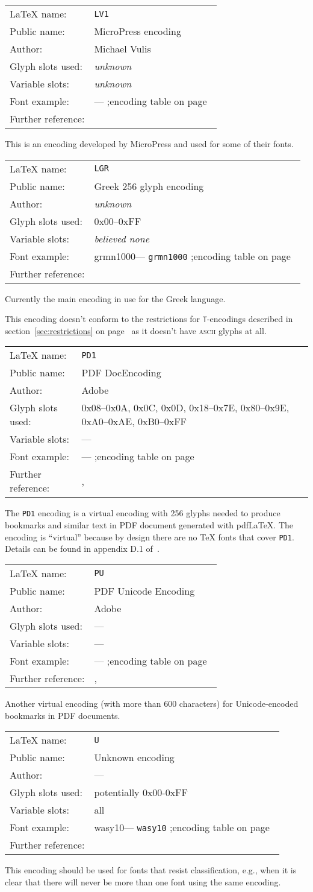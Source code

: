 \documentclass{ltxguide}[1994/11/20]
\makeatletter
\providecommand{\Enc}[1]{\texttt{#1}}
\newenvironment{encodinginfo}[7]%
  {\noindent
   \begin{tabularx}{\linewidth}{@{}l>{\raggedright\let\\\tabularnewline}X}%
     \LaTeX{} name:          & \texttt{#1}\\%
     Public name:          & #2\\%
     Author:                   & #3\\%
     Glyph slots used: & #4\\%
     Variable slots:     & #5\\%
     Font example:     & \def\@tempa{#6}\ifx\@tempa\@empty---%
                            \else\texttt{#6}\referenceftable{#6}\fi\\%
     Further reference:                & #7%
   \end{tabularx}%
   \par\nobreak
   \vspace*{3pt}%
   \quote
  }%
  {\endquote
   \vspace{6pt}}
\def\referenceftable#1{
  \@ifundefined{r@fonttable:#1}%
  \relax
  {;\space encoding table on page~\pageref{fonttable:#1}}%
}
\makeatother
\begin{document}
\begin{encodinginfo}{LV1}
        {MicroPress encoding}
        {Michael Vulis}
        {\emph{unknown}}
        {\emph{unknown}}
        {}
        {\cite[p.416]{A-W:MG2004}}

        This is an encoding developed by MicroPress and used for some of their
        fonts.

\end{encodinginfo}


\begin{encodinginfo}{LGR}
        {Greek 256 glyph encoding}
        {\emph{unknown}}
        {0x00--0xFF}
        {\emph{believed none}}
        {grmn1000}
        {\cite[p.575]{A-W:MG2004}}

        Currently the main encoding in use for the Greek language.

        This encoding doesn't conform to the restrictions for
        \Enc{T}-encodings described in section~\ref{sec:restrictions} on
        page~\pageref{sec:restrictions} as it doesn't have \textsc{ascii}
        glyphs at all.

\end{encodinginfo}


\begin{encodinginfo}
  {PD1}
  {PDF DocEncoding}
  {Adobe}
  {0x08--0x0A, 0x0C, 0x0D, 0x18--0x7E, 0x80--0x9E, 0xA0--0xAE, 0xB0--0xFF}
  {---}
  {}
  {\cite{Adobe:PDF-1.6}, \cite{hyperref}}

  The \Enc{PD1} encoding is a virtual encoding with 256 glyphs needed to
  produce bookmarks and similar text in PDF document generated with pdf\LaTeX.
  The encoding is ``virtual'' because by design there are no \TeX{}
  fonts that cover \Enc{PD1}. Details can be found in appendix D.1
  of~\cite{Adobe:PDF-1.6}.
\end{encodinginfo}

\begin{encodinginfo}
  {PU}
  {PDF Unicode Encoding}
  {Adobe}
  {---}
  {---}
  {}
  {\cite{Adobe:PDF-1.6}, \cite{hyperref}}

  Another virtual encoding (with more than 600 characters) for
  Unicode-encoded bookmarks in PDF documents.
\end{encodinginfo}

\begin{encodinginfo}{U}
        {Unknown encoding}
        {---}
        {potentially 0x00-0xFF}
        {all}
        {wasy10}
        {\cite[p.416]{A-W:MG2004}}

  This encoding should be used for fonts that resist classification,
  e.g., when it is clear that there will never be more than one font
  using the same encoding.

\end{encodinginfo}
\end{document}
